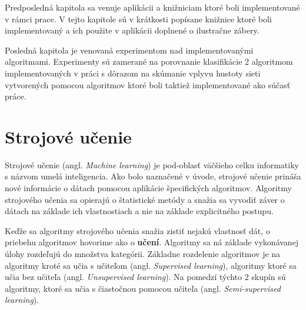 \documentclass[slovak,master,dept460,male,cpp,cpdeclaration]{diploma}
\begin{document}
Predposledná kapitola sa venuje aplikácii a knižniciam ktoré boli implementované v rámci prace. V tejto kapitole sú v krátkosti popísane knižnice ktoré boli implementovaný a ich použite v aplikácii doplnené o ilustračne zábery.

Posledná kapitola je venovaná experimentom nad implementovanými algoritmami. Experimenty sú zamerané na porovnanie klasifikácie 2 algoritmom implementovaných v práci s dôrazom na skúmanie vplyvu hustoty sieti vytvorených pomocou algoritmov ktoré boli taktiež implementované ako súčasť práce.


\section{Strojové učenie}
Strojové učenie (angl. \textit{Machine learning}) je pod-oblasť väčšieho celku informatiky s názvom umelá inteligencia. Ako bolo naznačené v úvode, strojové učenie prináša nové informácie o dátach pomocou aplikácie špecifických algoritmov. Algoritmy strojového učenia sa opierajú o štatistické metódy a snažia sa vyvodiť záver o dátach na základe ich vlastnostiach a nie na základe explicitného postupu.

Keďže sa algoritmy strojového učenia snažia zistiť nejakú vlastnosť dát, o priebehu algoritmov hovorime ako o \textbf{učení}. Algoritmy sa ná základe vykonávanej úlohy rozdeľujú  do množstva kategórii. Základne rozdelenie algoritmov je na algoritmy kroté sa učia s učiteľom (angl. \textit{Supervised learning}), algoritmy ktoré sa učia bez učiteľa (angl. \textit{Unsupervised learning}). Na pomedzí týchto 2 skupín sú algoritmy, ktoré sa učia s čiastočnou pomocou učiteľa (angl. \textit{Semi-supervised learning}).
\end{document}
